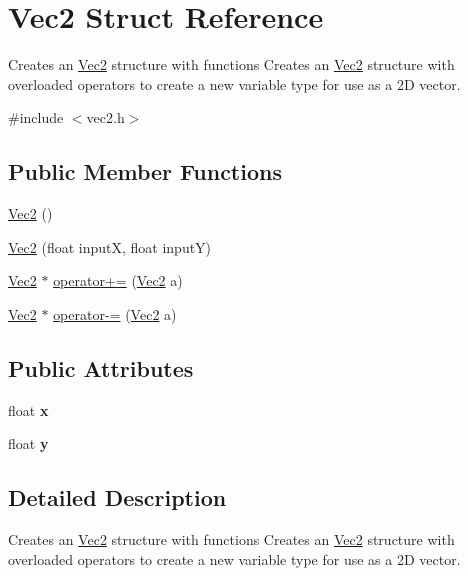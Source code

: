 \hypertarget{struct_vec2}{\section{Vec2 Struct Reference}
\label{struct_vec2}
}


Creates an \hyperlink{struct_vec2}{Vec2} structure with functions Creates an \hyperlink{struct_vec2}{Vec2} structure with overloaded operators to create a new variable type for use as a 2\+D vector.  




{\ttfamily \#include $<$vec2.\+h$>$}

\subsection*{Public Member Functions}
\begin{DoxyCompactItemize}
\item 
\hyperlink{struct_vec2_a76080feed7005893ecc634f903cfbae0}{Vec2} ()
\item 
\hyperlink{struct_vec2_a08e2e10202361659c3b7d003ee84ebec}{Vec2} (float input\+X, float input\+Y)
\item 
\hyperlink{struct_vec2}{Vec2} $\ast$ \hyperlink{struct_vec2_a00055ba3b91ef5faeaeb12a4289572f6}{operator+=} (\hyperlink{struct_vec2}{Vec2} a)
\item 
\hyperlink{struct_vec2}{Vec2} $\ast$ \hyperlink{struct_vec2_a6171d807b945b23574c33d6ddf1af74a}{operator-\/=} (\hyperlink{struct_vec2}{Vec2} a)
\end{DoxyCompactItemize}
\subsection*{Public Attributes}
\begin{DoxyCompactItemize}
\item 
\hypertarget{struct_vec2_adf8ee322d4b4bcc04146762c018d731f}{float {\bfseries x}}\label{struct_vec2_adf8ee322d4b4bcc04146762c018d731f}

\item 
\hypertarget{struct_vec2_a30543787e62f6d915543cf1dfb04c094}{float {\bfseries y}}\label{struct_vec2_a30543787e62f6d915543cf1dfb04c094}

\end{DoxyCompactItemize}


\subsection{Detailed Description}
Creates an \hyperlink{struct_vec2}{Vec2} structure with functions Creates an \hyperlink{struct_vec2}{Vec2} structure with overloaded operators to create a new variable type for use as a 2\+D vector. 

